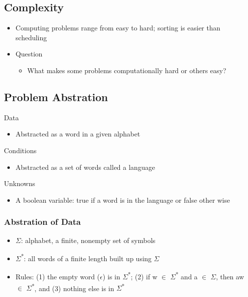 \documentclass[11pt]{article}
\begin{document}
\subsection{Complexity}
\label{sec:org7a952eb}
\begin{itemize}
\item Computing problems range from easy to hard; sorting is easier than scheduling
\item Question
\begin{itemize}
\item What makes some problems computationally hard or others easy?
\end{itemize}
\end{itemize}
\subsection{Problem Abstration}
\label{sec:orgb87c38b}
Data
\begin{itemize}
\item Abstracted as a word in a given alphabet
\end{itemize}
Conditions
\begin{itemize}
\item Abstracted as a set of words called a language
\end{itemize}
Unknowns
\begin{itemize}
\item A boolean variable: true if a word is in the language or false other wise
\end{itemize}
\subsubsection{Abstration of Data}
\label{sec:orgfb2873a}
\begin{itemize}
\item \(\Sigma\): alphabet, a finite, nonempty set of symbols
\item \(\Sigma\)\textsuperscript{*}: all words of a finite length built up using \(\Sigma\)
\item Rules: (1) the empty word (\(\epsilon\)) is in \(\Sigma\)\textsuperscript{*}; (2) if w \(\in\) \(\Sigma\)\textsuperscript{*} and a \(\in\) \(\Sigma\), then aw \(\in\) \(\Sigma\)\textsuperscript{*}, and (3) nothing else is in \(\Sigma\)\textsuperscript{*}
\end{itemize}
\end{document}
